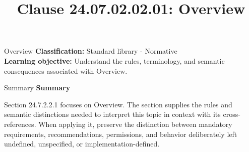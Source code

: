 \documentclass[10pt,letterpaper]{article}
\title{Clause 24.07.02.02.01: Overview}
\author{}
\date{}
\begin{document}
\maketitle
\begin{CornellOverviewBox}{Overview}
\textbf{Classification:} Standard library - Normative\\[2pt]
\textbf{Learning objective:} Understand the rules, terminology, and semantic consequences associated with Overview.
\end{CornellOverviewBox}\begin{CornellSummaryBox}{Summary}
{\sffamily\bfseries\color{Accent} Summary}\par\vspace{3pt}Section 24.7.2.2.1 focuses on Overview. The section supplies the rules and semantic distinctions needed to interpret this topic in context with its cross-references. When applying it, preserve the distinction between mandatory requirements, recommendations, permissions, and behavior deliberately left undefined, unspecified, or implementation-defined.
\end{CornellSummaryBox}
\end{document}
